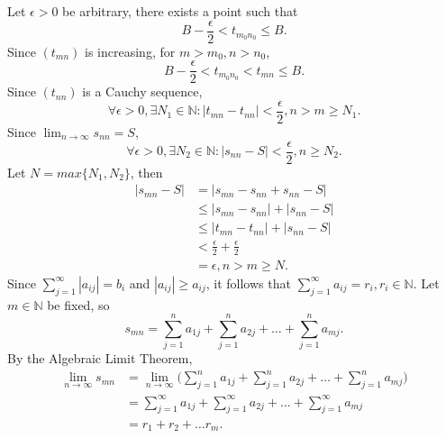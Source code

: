 \documentclass{article}
\begin{document}
            Let $\epsilon > 0$ be arbitrary, there exists a point such that
            \begin{equation*}
                B-\frac{\epsilon}{2} < t_{m_0n_0} \leq B.
            \end{equation*}
            Since $(t_{mn})$ is increasing, for $m>m_0,n>n_0$,
            \begin{equation*}
                B-\frac{\epsilon}{2} < t_{m_0n_0} < t_{mn} \leq B.
            \end{equation*}
            Since $(t_{nn})$ is a Cauchy sequence, 
            \begin{equation*}
                \forall \epsilon > 0, \exists N_1 \in \mathbb{N} : |t_{mn} - t_{nn}| < \frac{\epsilon}{2}, n > m \geq N_1.
            \end{equation*} 
            Since $\lim_{n \to \infty} s_{nn} = S$,
            \begin{equation*}
                \forall \epsilon > 0, \exists N_2 \in \mathbb{N} : |s_{nn} - S| < \frac{\epsilon}{2},  n \geq N_2.
            \end{equation*}
            Let $N = max\{N_1,N_2\}$, then
            \begin{align*}
                |s_{mn}-S| & = |s_{mn} - s_{nn} + s_{nn} -S| \\
                & \leq |s_{mn} - s_{nn}| + |s_{nn} -S| \\
                & \leq |t_{mn} - t_{nn}| + |s_{nn} -S| \\
                & < \frac{\epsilon}{2} + \frac{\epsilon}{2} \\
                & = \epsilon, n>m \geq N.
            \end{align*}
            Since $\sum_{j=1}^\infty |a_{ij}| = b_i$ and $|a_{ij}| \geq a_{ij}$, it follows that $\sum_{j=1}^\infty a_{ij} = r_i,r_i \in \mathbb{N}$. Let $m \in \mathbb{N}$ be fixed, so
            \begin{equation*}
                s_{mn} = \sum_{j=1}^n a_{1j} + \sum_{j=1}^n a_{2j} + \dots + \sum_{j=1}^n a_{mj}.
            \end{equation*}
            By the Algebraic Limit Theorem,
            \begin{align*}
                \lim_{n \to \infty} s_{mn} & = \lim_{n \to \infty} \Bigg(\sum_{j=1}^n a_{1j} + \sum_{j=1}^n a_{2j} + \dots + \sum_{j=1}^n a_{mj}\Bigg) \\
                & = \sum_{j=1}^\infty a_{1j} + \sum_{j=1}^\infty a_{2j} + \dots + \sum_{j=1}^\infty a_{mj} \\
                & = r_1 + r_2 + \dots r_m.
            \end{align*}
\end{document}
